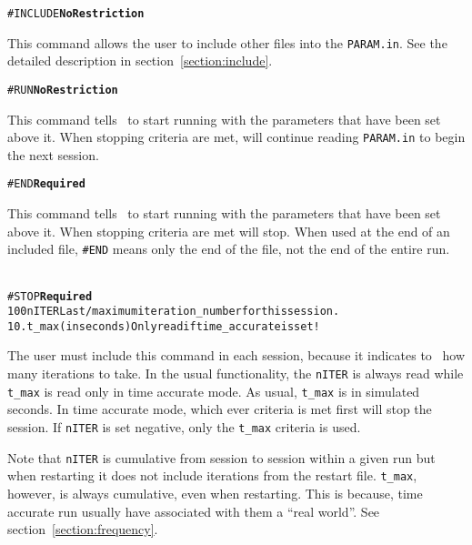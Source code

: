 \begin{alltt}
#INCLUDE \hfill {\bf No Restriction}
\end{alltt}

This command allows the user to include other files into the {\tt PARAM.in}.
See the detailed description in section~\ref{section:include}.
\ \ \\

\begin{alltt}
#RUN \hfill {\bf No Restriction}
\end{alltt}

This command tells \BATSRUS\ to start running with the parameters
that have been set above it.  When stopping criteria are met, \BATSRUS
will continue reading {\tt PARAM.in} to begin the next session.
\ \ \\


\begin{alltt}
#END \hfill {\bf Required}
\end{alltt}

This command tells \BATSRUS\ to start running with the parameters
that have been set above it.  When stopping criteria are met \BATSRUS
will stop.  When used at the end of an included file, {\tt \#END}
means only the end of the file, not the end of the entire run.
\ \ \\



\begin{alltt}
#STOP       \hfill {\bf Required}
100                    nITER Last/maximum iteration_number for this session.
10.                    t_max (in seconds) Only read if time_accurate is set!
\end{alltt}

The user must include this command in each session, because it indicates 
to \BATSRUS\ how many iterations to take.  In the usual functionality, 
the {\tt nITER} is always read while {\tt t\_max} is read only in time accurate
mode.  As usual, {\tt t\_max} is in simulated seconds.  In time accurate mode, 
which ever criteria is met first will stop the session.  If {\tt nITER} is set
negative, only the {\tt t\_max} criteria is used.

Note that {\tt nITER} is cumulative from session to session within a given run
but when restarting it does not include iterations from the restart file.
{\tt t\_max}, however, is always cumulative, even when restarting.  This is
because, time accurate run usually have associated with them a ``real world''.
See section~\ref{section:frequency}.
\ \ \\

